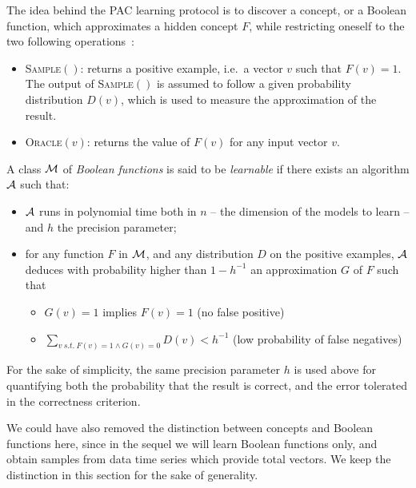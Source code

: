 \documentclass{llncs}
\begin{document}
The idea behind the PAC learning protocol is to discover a concept, or a Boolean function, which approximates a hidden concept $F$, while restricting oneself to the two following operations~:
\begin{itemize}
  \item
\textsc{Sample}$()$: returns a positive example, i.e.~a vector $v$ such that $F(v)=1$.
The output of \textsc{Sample}$()$ is assumed to follow a given probability distribution $D(v)$, which is used to measure the approximation of the result.
  \item
\textsc{Oracle}$(v)$: returns the value of $F(v)$ for any input vector $v$.
\end{itemize}


\begin{definition}\label{def:learnclass}
   A class $\cal M$ of \emph{Boolean functions} is said to be \emph{learnable}
   if there exists an algorithm $\cal A$ such that:
   \begin{itemize}
      \item $\cal A$ runs in polynomial time both in $n$ -- the dimension of the models to learn -- and $h$ the precision parameter;
      \item
         for any function $F$ in $\cal M$, and any distribution $D$ on the positive examples,
         $\cal A$ deduces with probability higher than $1-h^{-1}$ an approximation $G$ of $F$ such that
         \begin{itemize}
            \item $G(v)=1$ implies $F(v)=1$ (no false positive)
            \item
               $\displaystyle\sum_{v\ s.t.\ F(v)=1\wedge G(v)=0} D(v) < h^{-1}$ (low probability of false negatives)
         \end{itemize}
   \end{itemize}
\end{definition}

For the sake of simplicity, the same precision parameter $h$ is used above for quantifying both the probability that the result is correct,
and the error tolerated in the correctness criterion.

We could have also removed the distinction between concepts and Boolean functions here,
since in the sequel we will learn Boolean functions only, and obtain samples from data time series which provide total vectors.
We keep the distinction in this section for the sake of generality.
\end{document}
